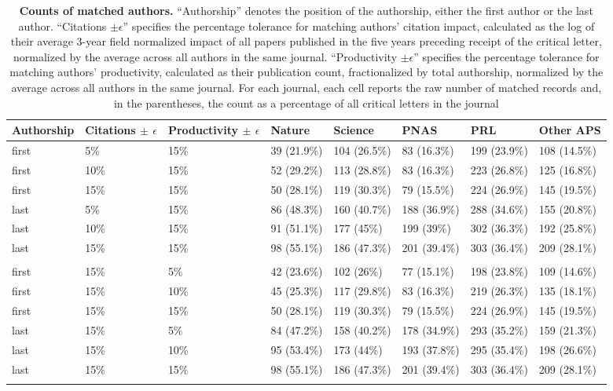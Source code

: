 \documentclass[12pt]{article} %
\begin{document}
\clearpage
\begin{table}[p]
\scriptsize
\centering
\caption{
\textbf{Counts of matched authors.} 
``Authorship'' denotes the position of the authorship, either the first author or the last author. 
``Citations $\pm \epsilon$'' specifies the percentage tolerance for matching authors' citation impact, calculated as the log of their average 3-year field normalized impact of all papers published in the five years preceding receipt of the critical letter, normalized by the average across all authors in the same journal. 
``Productivity $\pm \epsilon$'' specifies the percentage tolerance for matching authors' productivity, calculated as their publication count, fractionalized by total authorship, normalized by the average across all authors in the same journal.
For each journal, each cell reports the raw number of matched records and, in the parentheses, the count as a percentage of all critical letters in the journal
}
\label{si:tab:authors-matched-counts}
\begin{tabular}{llllllll}
  \toprule
Authorship & Citations $\pm$ $\epsilon$ & Productivity $\pm$ $\epsilon$ & Nature & Science & PNAS & PRL & Other APS \\ 
  \midrule
first & 5\% & 15\% & 39 (21.9\%) & 104 (26.5\%) & 83 (16.3\%) & 199 (23.9\%) & 108 (14.5\%) \\ 
  first & 10\% & 15\% & 52 (29.2\%) & 113 (28.8\%) & 83 (16.3\%) & 223 (26.8\%) & 125 (16.8\%) \\ 
  first & 15\% & 15\% & 50 (28.1\%) & 119 (30.3\%) & 79 (15.5\%) & 224 (26.9\%) & 145 (19.5\%) \\ 
  last & 5\% & 15\% & 86 (48.3\%) & 160 (40.7\%) & 188 (36.9\%) & 288 (34.6\%) & 155 (20.8\%) \\ 
  last & 10\% & 15\% & 91 (51.1\%) & 177 (45\%) & 199 (39\%) & 302 (36.3\%) & 192 (25.8\%) \\ 
  last & 15\% & 15\% & 98 (55.1\%) & 186 (47.3\%) & 201 (39.4\%) & 303 (36.4\%) & 209 (28.1\%) \\ 
   &  &  &  &  &  &  &  \\ 
  first & 15\% & 5\% & 42 (23.6\%) & 102 (26\%) & 77 (15.1\%) & 198 (23.8\%) & 109 (14.6\%) \\ 
  first & 15\% & 10\% & 45 (25.3\%) & 117 (29.8\%) & 83 (16.3\%) & 219 (26.3\%) & 135 (18.1\%) \\ 
  first & 15\% & 15\% & 50 (28.1\%) & 119 (30.3\%) & 79 (15.5\%) & 224 (26.9\%) & 145 (19.5\%) \\ 
  last & 15\% & 5\% & 84 (47.2\%) & 158 (40.2\%) & 178 (34.9\%) & 293 (35.2\%) & 159 (21.3\%) \\ 
  last & 15\% & 10\% & 95 (53.4\%) & 173 (44\%) & 193 (37.8\%) & 295 (35.4\%) & 198 (26.6\%) \\ 
  last & 15\% & 15\% & 98 (55.1\%) & 186 (47.3\%) & 201 (39.4\%) & 303 (36.4\%) & 209 (28.1\%) \\ 
   &  &  &  &  &  &  &  \\ 
   \bottomrule
\end{tabular}
\end{table}
\end{document}
